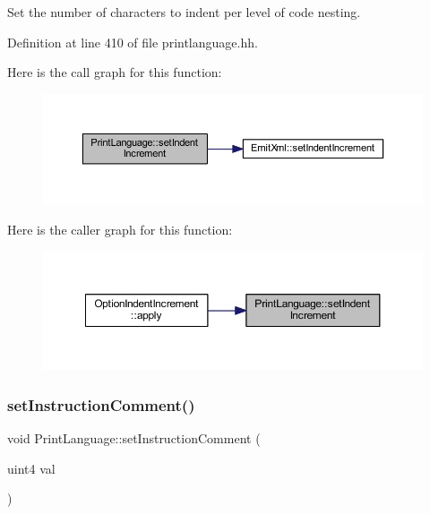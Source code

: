 Set the number of characters to indent per level of code nesting. 



Definition at line 410 of file printlanguage.\+hh.

Here is the call graph for this function\+:
\nopagebreak
\begin{figure}[H]
\begin{center}
\leavevmode
\includegraphics[width=350pt]{class_print_language_aeb4cf2e83c51955a1f03b38c322838cc_cgraph}
\end{center}
\end{figure}
Here is the caller graph for this function\+:
\nopagebreak
\begin{figure}[H]
\begin{center}
\leavevmode
\includegraphics[width=350pt]{class_print_language_aeb4cf2e83c51955a1f03b38c322838cc_icgraph}
\end{center}
\end{figure}
\mbox{\label{class_print_language_a74c68960b53e9db5de7a3cc3651fe652}} 
\subsubsection{\texorpdfstring{setInstructionComment()}{setInstructionComment()}}
{\footnotesize\ttfamily void Print\+Language\+::set\+Instruction\+Comment (\begin{DoxyParamCaption}\item[{uint4}]{val }\end{DoxyParamCaption})\hspace{0.3cm}{\ttfamily [inline]}}



